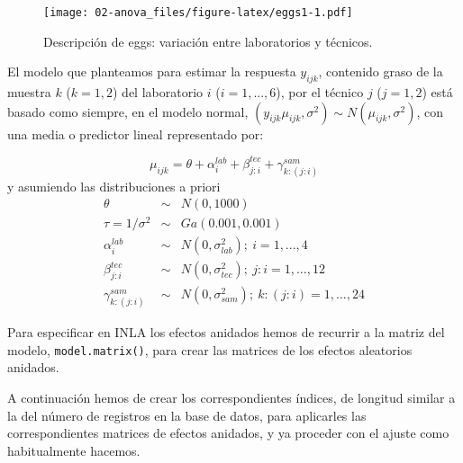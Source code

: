 \documentclass[
]{book}
\begin{document}
\begin{figure}
\centering
\texttt{[image: 02-anova\_files/figure-latex/eggs1-1.pdf]}
\caption{\label{fig:eggs1}Descripción de eggs: variación entre laboratorios y técnicos.}
\end{figure}

El modelo que planteamos para estimar la respuesta \(y_{ijk}\), contenido graso de la muestra \(k\) (\(k=1,2\)) del laboratorio \(i\) (\(i=1,...,6\)), por el técnico \(j\) (\(j=1,2\)) está basado como siempre, en el modelo normal, \((y_{ijk}\mu_{ijk},\sigma^2) \sim N(\mu_{ijk},\sigma^2)\), con una media o predictor lineal representado por:

\[ \mu_{ijk}= \theta + \alpha_i^{lab} + \beta_{j:i}^{tec} + \gamma_{k:(j:i)}^{sam}\]
y asumiendo las distribuciones a priori
\begin{eqnarray*}
\theta &\sim& N(0,1000) \\
\tau=1/\sigma^2 &\sim& Ga(0.001,0.001) \\
\alpha_i^{lab}&\sim& N(0,\sigma_{lab}^2); \  i = 1,...,4 \\
\beta_{j:i}^{tec}&\sim& N(0,\sigma_{tec}^2); \  j:i = 1,...,12 \\
\gamma_{k:(j:i)}^{sam}&\sim& N(0,\sigma_{sam}^2); \ k:(j:i)=1,...,24
\end{eqnarray*}

Para especificar en INLA los efectos anidados hemos de recurrir a la matriz del modelo, \texttt{model.matrix()}, para crear las matrices de los efectos aleatorios anidados.

A continuación hemos de crear los correspondientes índices, de longitud similar a la del número de registros en la base de datos, para aplicarles las correspondientes matrices de efectos anidados, y ya proceder con el ajuste como habitualmente hacemos.
\end{document}
